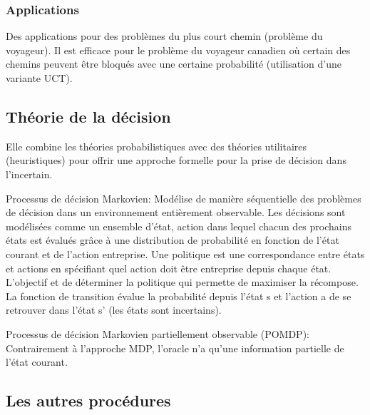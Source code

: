 \subsubsection{Applications}


Des applications pour des problèmes du plus court chemin (problème du voyageur). Il est efficace pour le problème du voyageur canadien où certain des chemins peuvent être bloqués avec une certaine probabilité (utilisation d'une variante UCT).

\subsection{Théorie de la décision}
Elle combine les théories probabilistiques avec des théories utilitaires (heuristiques) pour offrir une approche formelle pour la prise de décision dans l'incertain.

Processus de décision Markovien: Modélise de manière séquentielle des problèmes de décision dans un environnement entièrement observable.
Les décisions sont modélisées comme un ensemble d'état, action dans lequel chacun des prochains états est évalués grâce à une distribution de probabilité en fonction de l'état courant et de l'action entreprise.
Une politique est une correspondance entre états et actions en spécifiant quel action doit être entreprise depuis chaque état.
L'objectif et de déterminer la politique qui permette de maximiser la récompose.
La fonction de transition évalue la probabilité depuis l'état s et l'action a de se retrouver dans l'état s' (les états sont incertains).


Processus de décision Markovien partiellement  observable (POMDP):
Contrairement à l'approche MDP, l'oracle n'a qu'une information partielle de l'état courant.

\subsection{Les autres procédures}
